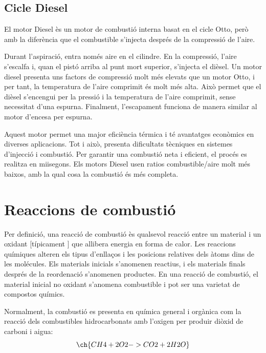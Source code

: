 \subsection{Cicle Diesel}

El motor Diesel \`es un motor de combusti\'o interna basat en el cicle Otto, per\`o amb la difer\`encia que el combustible s'injecta despr\'es de la compressi\'o de l'aire. 

Durant l'aspiraci\'o, entra nom\'es aire en el cilindre. En la compressi\'o, l'aire s'escalfa i, quan el pist\'o arriba al punt mort superior, s'injecta el di\`esel. Un motor diesel presenta uns factors de compressió molt més elevats que un motor Otto, i per tant, la temperatura de l'aire comprimit és molt més alta. Això permet que el dièsel s'encengui per la pressió i la temperatura de l'aire comprimit, sense necessitat d'una espurna. Finalment, l'escapament funciona de manera similar al motor d'encesa per espurna. 

Aquest motor permet una major efici\`encia t\'ermica i t\'e avantatges econ\`omics en diverses aplicacions. Tot i aix\`o, presenta dificultats t\`ecniques en sistemes d'injecci\'o i combusti\'o. Per garantir una combusti\'o neta i eficient, el proc\'es es realitza en mi\lgem isegons. Els motors Diesel usen ratios combustible/aire molt més baixos, amb la qual cosa la combustió és més completa.





    \section{Reaccions de combustió}

    Per definici\'o, una reacci\'o de combusti\'o \`es qualsevol reacci\'o entre un material i un oxidant [t\'ipicament ] que allibera energia en forma de calor. Les reaccions qu\'imiques alteren els tipus d'enlla\c{c}os i les posicions relatives dels \`atoms dins de les mol\'ecules. Els materials inicials s'anomenen reactius, i els materials finals despr\'es de la reordenaci\'o s'anomenen productes. En una reacci\'o de combusti\'o, el material inicial no oxidant s'anomena combustible i pot ser una varietat de compostos qu\'imics\cite{bowers_understanding_2014}.

Normalment, la combusti\'o es presenta en qu\'imica general i org\`anica com la reacci\'o dels combustibles hidrocarbonats amb l'oxigen per produir di\`oxid de carboni i aigua:
\begin{equation}
\ch{CH4 + 2 O2 -> CO2 + 2 H2O}
\end{equation}

